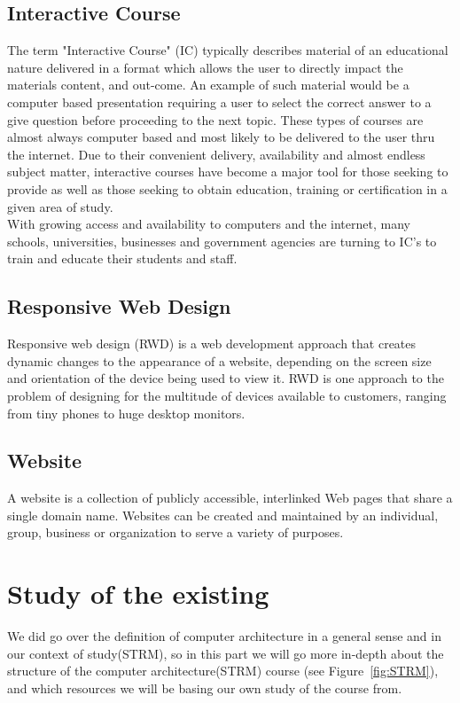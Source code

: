 \subsection{Interactive Course}
The term "Interactive Course" (IC) typically describes material of an educational nature 
delivered in a format which allows the user to directly impact the materials content, and out-come.
An example of such material would be a computer based presentation requiring a user to select the correct 
answer to a give question before proceeding to the next topic.
These types of courses are almost always computer based and most likely to be delivered to the user thru the internet. 
Due to their convenient delivery, availability and almost endless subject matter, 
interactive courses have become a major tool for those seeking to provide as well as those seeking to obtain education, 
training or certification in a given area of study.\cite{noauthor_undated-dt}\\
With growing access and availability to computers and the internet, many schools, universities, 
businesses and government agencies are turning to IC's to train and educate their students and staff.\cite{noauthor_undated-dt}


\subsection{Responsive Web Design}
Responsive web design (RWD) is a web development approach that creates dynamic 
changes to the appearance of a website, depending on the screen size and orientation of 
the device being used to view it. RWD is one approach to the problem of designing for 
the multitude of devices available to customers, ranging from tiny phones to huge desktop monitors.\cite{noauthor_undated-an}

\subsection{Website}
A website is a collection of publicly accessible, interlinked Web pages that share 
a single domain name. Websites can be created and maintained by an individual, group, 
business or organization to serve a variety of purposes.\cite{Techopedia2011-zo}

\section{Study of the existing}
We did go over the definition of computer architecture in a general sense and in our context of study(STRM),
so in this part we will go more in-depth about the structure of the computer architecture(STRM) course (see Figure~\ref{fig:STRM}), and which resources we will be basing our own study of the course from.

